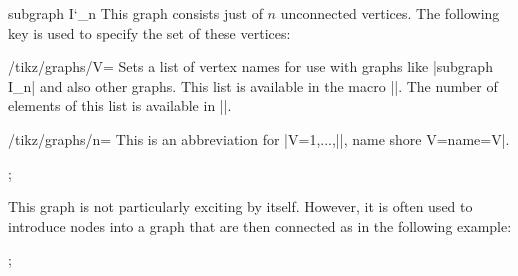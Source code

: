 \begin{graph}{subgraph I\char`\_n}
  This graph consists just of $n$ unconnected vertices. The following
  key is used to specify the set of these vertices:
  \begin{key}{/tikz/graphs/V=}
    Sets a list of vertex names for use with graphs like
    |subgraph I_n| and also other graphs. This list is available in
    the macro |\tikzgraphV|. The number of elements of this list is
    available in |\tikzgraphVnum|.
  \end{key}
  \begin{key}{/tikz/graphs/n=}
    This is an abbreviation for
    |V={1,...,||}, name shore V={name=V}|.
  \end{key}
\begin{codeexample}[]
\tikz {};    
\end{codeexample}
  This graph is not particularly exciting by itself. However, it is
  often used to introduce nodes into a graph that are then connected
  as in the following example:
\begin{codeexample}[]
\tikz {};    
\end{codeexample}
\end{graph}



